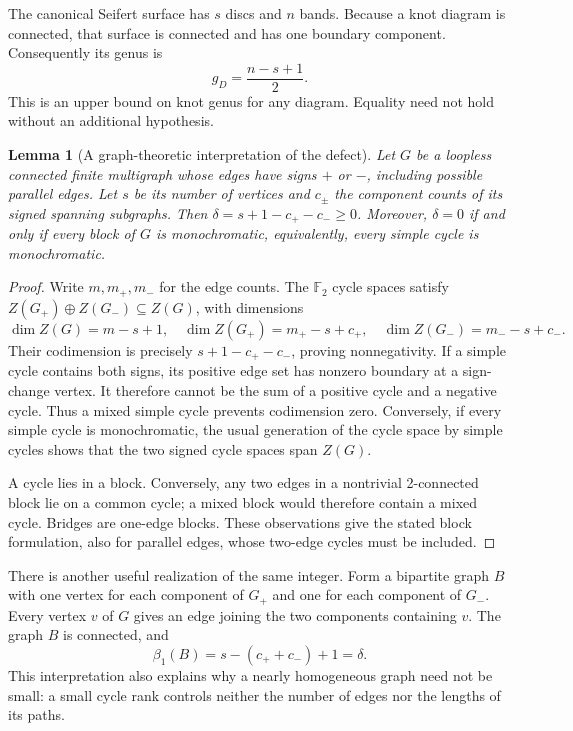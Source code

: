 \documentclass[11pt,letterpaper]{article}
\newtheorem{lemma}[theorem]{Lemma}
\newcommand{\F}{\mathbb F_2}
\begin{document}
The canonical Seifert surface has $s$ discs and $n$ bands. Because a knot
diagram is connected, that surface is connected and has one boundary
component. Consequently its genus is
\begin{equation}\label{eq:canonicalgenus}
 g_D=\frac{n-s+1}{2}.
\end{equation}
This is an upper bound on knot genus for any diagram. Equality need not hold
without an additional hypothesis.

\begin{lemma}[A graph-theoretic interpretation of the defect]
\label{lem:defect}
Let $G$ be a loopless connected finite multigraph whose edges have signs $+$ or $-$,
including possible parallel edges. Let $s$ be its number of vertices and
$c_\pm$ the component counts of its signed spanning subgraphs. Then
$\delta=s+1-c_+-c_-\ge0$. Moreover, $\delta=0$ if and only if every block of
$G$ is monochromatic, equivalently, every simple cycle is monochromatic.
\end{lemma}
\begin{proof}
Write $m,m_+,m_-$ for the edge counts. The $\F$ cycle spaces satisfy
$Z(G_+)\oplus Z(G_-)\subseteq Z(G)$, with dimensions
\[
 \dim Z(G)=m-s+1,\quad
 \dim Z(G_+)=m_+-s+c_+,\quad
 \dim Z(G_-)=m_--s+c_-.
\]
Their codimension is precisely $s+1-c_+-c_-$, proving nonnegativity.
If a simple cycle contains both signs, its positive edge set has nonzero
boundary at a sign-change vertex. It therefore cannot be the sum of a
positive cycle and a negative cycle. Thus a mixed simple cycle prevents
codimension zero. Conversely, if every simple cycle is monochromatic, the
usual generation of the cycle space by simple cycles shows that the two
signed cycle spaces span $Z(G)$.

A cycle lies in a block. Conversely, any two edges in a nontrivial
2-connected block lie on a common cycle; a mixed block would therefore
contain a mixed cycle. Bridges are one-edge blocks. These observations give
the stated block formulation, also for parallel edges, whose two-edge
cycles must be included.
\end{proof}

There is another useful realization of the same integer. Form a bipartite
graph $B$ with one vertex for each component of $G_+$ and one for each
component of $G_-$. Every vertex $v$ of $G$ gives an edge joining the two
components containing $v$. The graph $B$ is connected, and
\[
 \beta_1(B)=s-(c_++c_-)+1=\delta.
\]
This interpretation also explains why a nearly homogeneous graph need not
be small: a small cycle rank controls neither the number of edges nor the
lengths of its paths.
\end{document}
